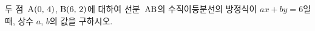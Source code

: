 두 점~$\mathrm{A}(0,\,4)$, $\mathrm{B}(6,\,2)$에 대하여 선분~$\mathrm{AB}$의 수직이등분선의 방정식이 $ax+by=6$일 때, 상수 $a$, $b$의 값을 구하시오.
